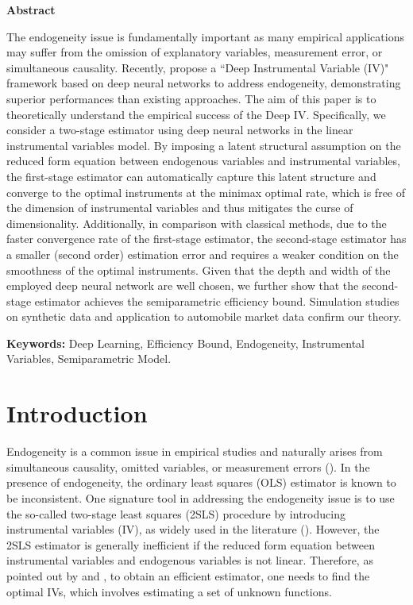 \documentclass[11pt, preprint]{imsart}
\numberwithin{equation}{section}
\theoremstyle{plain}
\theoremstyle{definition}
\begin{document}
 \begin{center}
\textbf{Abstract}
\end{center}
The endogeneity issue is fundamentally important as many empirical applications may suffer from the omission of explanatory variables, measurement error, or simultaneous causality. Recently, \cite{hllt17} propose a ``Deep Instrumental Variable (IV)" framework based on deep neural networks to address endogeneity, demonstrating superior performances than existing approaches. The aim of this paper is to theoretically understand the empirical success of the Deep IV. Specifically, we consider a two-stage estimator using deep neural networks in the linear instrumental variables model. By imposing a latent structural assumption on the reduced form equation between endogenous variables and instrumental variables, the first-stage estimator can automatically capture this latent structure and converge to the optimal instruments at the minimax optimal rate, which is free of the dimension of instrumental variables and thus mitigates the curse of dimensionality. Additionally, in comparison with classical methods, due to the faster convergence rate of the first-stage estimator, the second-stage estimator has {a smaller (second order) estimation error} and requires a weaker condition on the smoothness of the optimal instruments. Given that the depth and width of the employed deep neural network are well chosen, we further show that the second-stage estimator achieves the semiparametric efficiency bound. Simulation studies on synthetic data and application to automobile market data confirm our theory.

\noindent \textbf{Keywords:} Deep Learning, Efficiency Bound, Endogeneity, Instrumental Variables, Semiparametric Model.
\begin{center}
\textbf{\newpage}
\end{center} 
\section{Introduction}
Endogeneity is a common issue in empirical studies and naturally arises from simultaneous causality, omitted variables, or measurement errors (\citealp{tbr08,a85,y96,m03}).
In the presence of endogeneity, the ordinary least squares (OLS) estimator is known to be inconsistent. One signature tool in addressing the endogeneity issue is to use the so-called two-stage least squares (2SLS) procedure by introducing instrumental variables (IV), as widely used in the literature (\citealp{ak91,ss97,pc06,ll12}). However, the 2SLS estimator is generally inefficient if the reduced form equation between instrumental variables and endogenous variables is not linear. Therefore, as pointed out by \cite{a74} and \cite{n90}, to obtain an efficient estimator, one needs to find the optimal IVs, which involves estimating a set of unknown functions. 
\end{document}
